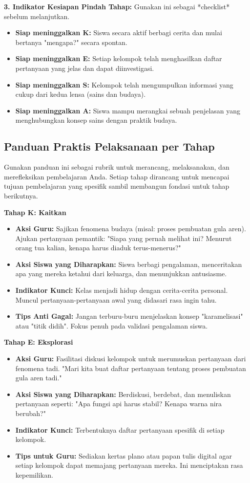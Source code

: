 \documentclass[12pt,a4paper,oneside]{book}
\begin{document}
\textbf{3. Indikator Kesiapan Pindah Tahap:}
Gunakan ini sebagai *checklist* sebelum melanjutkan.
\begin{itemize}
    \item \textbf{Siap meninggalkan K:} Siswa secara aktif berbagi cerita dan mulai bertanya "mengapa?" secara spontan.
    \item \textbf{Siap meninggalkan E:} Setiap kelompok telah menghasilkan daftar pertanyaan yang jelas dan dapat diinvestigasi.
    \item \textbf{Siap meninggalkan S:} Kelompok telah mengumpulkan informasi yang cukup dari kedua lensa (sains dan budaya).
    \item \textbf{Siap meninggalkan A:} Siswa mampu merangkai sebuah penjelasan yang menghubungkan konsep sains dengan praktik budaya.
\end{itemize}

\subsection{Panduan Praktis Pelaksanaan per Tahap}

Gunakan panduan ini sebagai rubrik untuk merancang, melaksanakan, dan merefleksikan pembelajaran Anda. Setiap tahap dirancang untuk mencapai tujuan pembelajaran yang spesifik sambil membangun fondasi untuk tahap berikutnya.

\textbf{Tahap K: Kaitkan}
\begin{itemize}
    \item \textbf{Aksi Guru:} Sajikan fenomena budaya (misal: proses pembuatan gula aren). Ajukan pertanyaan pemantik: "Siapa yang pernah melihat ini? Menurut orang tua kalian, kenapa harus diaduk terus-menerus?"
    \item \textbf{Aksi Siswa yang Diharapkan:} Siswa berbagi pengalaman, menceritakan apa yang mereka ketahui dari keluarga, dan menunjukkan antusiasme.
    \item \textbf{Indikator Kunci:} Kelas menjadi hidup dengan cerita-cerita personal. Muncul pertanyaan-pertanyaan awal yang didasari rasa ingin tahu.
    \item \textbf{Tips Anti Gagal:} Jangan terburu-buru menjelaskan konsep "karamelisasi" atau "titik didih". Fokus penuh pada validasi pengalaman siswa.
\end{itemize}

\textbf{Tahap E: Eksplorasi}
\begin{itemize}
    \item \textbf{Aksi Guru:} Fasilitasi diskusi kelompok untuk merumuskan pertanyaan dari fenomena tadi. "Mari kita buat daftar pertanyaan tentang proses pembuatan gula aren tadi."
    \item \textbf{Aksi Siswa yang Diharapkan:} Berdiskusi, berdebat, dan menuliskan pertanyaan seperti: "Apa fungsi api harus stabil? Kenapa warna nira berubah?"
    \item \textbf{Indikator Kunci:} Terbentuknya daftar pertanyaan spesifik di setiap kelompok.
    \item \textbf{Tips untuk Guru:} Sediakan kertas plano atau papan tulis digital agar setiap kelompok dapat memajang pertanyaan mereka. Ini menciptakan rasa kepemilikan.
\end{itemize}
\end{document}
